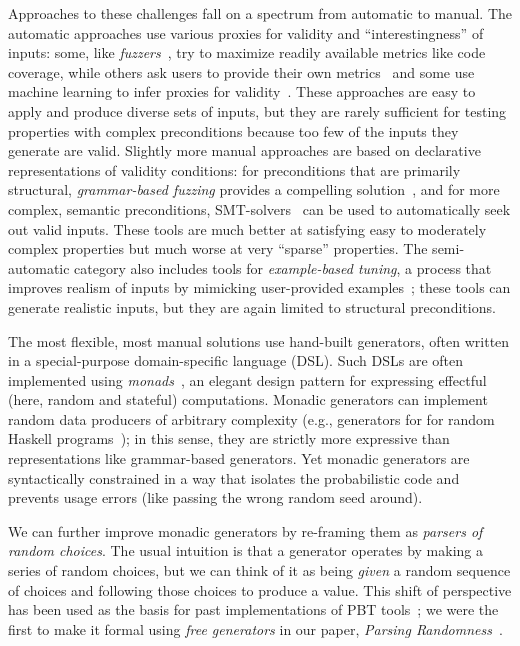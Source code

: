 Approaches to these challenges
fall on a spectrum from automatic to manual. The automatic approaches use
various proxies for validity and ``interestingness'' of
inputs: some, like {\em
fuzzers}~\cite{afl-readme}, try to maximize readily available metrics like code
coverage, while others ask users to provide their own metrics~\cite{loscher2017targetedpbt} and
some use machine learning to infer proxies for
validity~\cite{godefroid2017learn, DBLP:conf/icse/ReddyLPS20}. These approaches
are easy to apply and produce diverse sets of inputs, but they are rarely
sufficient for testing properties with complex
preconditions because too few of the inputs they generate are
valid. Slightly more
manual approaches are based on declarative representations of validity
conditions: for preconditions that are primarily structural, {\em grammar-based
fuzzing} provides a compelling solution~\cite{godefroid2008grammar,
holler2012fuzzing, veggalam2016ifuzzer, wang2019superion,
srivastava2021gramatron}, and for more complex, semantic preconditions,
SMT-solvers~\cite{dewey2017automated, beginners-luck,
steinhofel_input_2022} can be used to automatically seek out valid
inputs. These tools are
much better at satisfying easy to moderately complex properties but
much worse at very ``sparse'' properties. The semi-automatic
category also includes tools for {\em example-based tuning}, a process that
improves realism of inputs by mimicking user-provided
examples~\cite{soremekun2020inputs}; these tools can generate
realistic inputs, but they are again limited to structural preconditions.

The most flexible, most manual solutions use hand-built
generators, often written in a special-purpose domain-specific language (DSL).
Such DSLs are often implemented using {\em
monads\/}~\cite{moggi1991notions}, an elegant design pattern for
expressing effectful (here, random and stateful) computations. Monadic
generators can implement random data producers of arbitrary complexity
(e.g., generators for for random Haskell
programs~\cite{palka_testing_2011}); in this sense, they are strictly more expressive than
representations like grammar-based generators.  Yet monadic generators are
syntactically constrained in a way that isolates the probabilistic code and
prevents usage errors (like passing the wrong random seed around).

We can further improve monadic generators by re-framing them as {\em
  parsers of random choices}. The usual intuition is that a generator
operates by making a series of random choices, but we can think of
it as being {\em given} a random sequence of choices and following
those choices to produce a value. This shift of perspective has been
used as the basis for past implementations of PBT
tools~\cite{maciver2019hypothesis, dolan2017testing}; we were the
first to make it
formal using {\em free generators}
in our paper, {\em Parsing Randomness}~\cite{goldstein2022parsing}.


